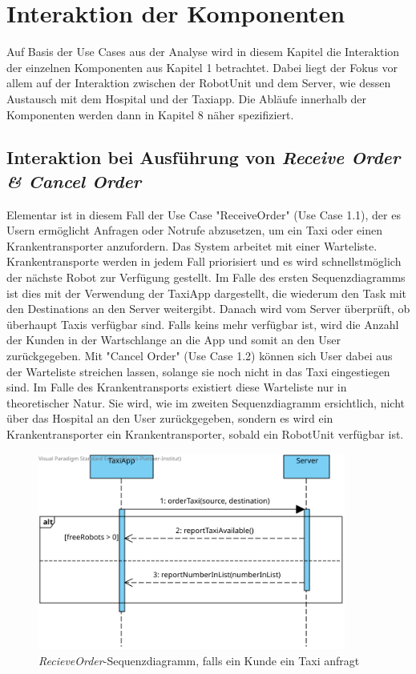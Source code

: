 \section{Interaktion der Komponenten}
Auf Basis der Use Cases aus der Analyse wird in diesem Kapitel die Interaktion der einzelnen Komponenten aus Kapitel 1 betrachtet. 
Dabei liegt der Fokus vor allem auf der Interaktion zwischen der RobotUnit und dem Server, wie dessen Austausch mit dem Hospital und der Taxiapp. 
Die Abläufe innerhalb der Komponenten werden dann in Kapitel 8 näher spezifiziert. \\


\subsection*{Interaktion bei Ausführung von \emph{Receive Order \& Cancel Order}}

Elementar ist in diesem Fall der Use Case "ReceiveOrder" (Use Case 1.1), der es Usern ermöglicht Anfragen oder Notrufe abzusetzen, um ein Taxi oder einen Krankentransporter anzufordern. 
Das System arbeitet mit einer Warteliste. 
Krankentransporte werden in jedem Fall priorisiert und es wird schnellstmöglich der nächste Robot zur Verfügung gestellt. 
Im Falle des ersten Sequenzdiagramms ist dies mit der Verwendung der TaxiApp dargestellt, die wiederum den Task mit den Destinations an den Server weitergibt. 
Danach wird vom Server überprüft, ob überhaupt Taxis verfügbar sind.
Falls keins mehr verfügbar ist, wird die Anzahl der Kunden in der Wartschlange an die App und somit an den User zurückgegeben. 
Mit "Cancel Order" (Use Case 1.2) können sich User dabei aus der Warteliste streichen lassen, solange sie noch nicht in das Taxi eingestiegen sind. 
Im Falle des Krankentransports existiert diese Warteliste nur in theoretischer Natur. 
Sie wird, wie im zweiten Sequenzdiagramm ersichtlich, nicht über das Hospital an den User zurückgegeben, sondern es wird ein Krankentransporter ein Krankentransporter, sobald ein RobotUnit verfügbar ist. \\

\begin{figure}[H]
	\centering
	\includegraphics[width=0.9\textwidth]{img/2-Entwurf-RecieveOrder-Taxi}
	\caption{\emph{RecieveOrder}-Sequenzdiagramm, falls ein Kunde ein Taxi anfragt}
	\label{SequenzDiagrammInteraktion}
\end{figure}

